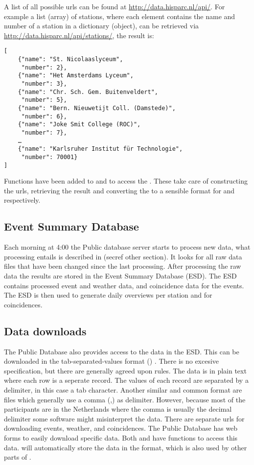 A list of all possible urls can be found at \url{http://data.hisparc.nl/api/}. For example a list (array) of \hisparc stations, where each element contains the name and number of a station in a dictionary (object), can be retrieved via \url{http://data.hisparc.nl/api/stations/}, the result is:

\begin{verbatim}
[
    {"name": "St. Nicolaaslyceum",
     "number": 2},
    {"name": "Het Amsterdams Lyceum",
     "number": 3},
    {"name": "Chr. Sch. Gem. Buitenveldert",
     "number": 5},
    {"name": "Bern. Nieuwetijt Coll. (Damstede)",
     "number": 6},
    {"name": "Joke Smit College (ROC)",
     "number": 7},
    …
    {"name": "Karlsruher Institut für Technologie",
     "number": 70001}
]
\end{verbatim}

Functions have been added to \sapphire and \jsparc to access the \api. These take care of constructing the urls, retrieving the result and converting the \json to a sensible format for \python and \javascript respectively.


\subsection{Event Summary Database}

Each morning at 4:00 \utc the Public database server starts to process new data, what processing entails is described in (secref other section). It looks for all raw data files that have been changed since the last processing. After processing the raw data the results are stored in the Event Summary Database (ESD). The ESD contains processed event and weather data, and coincidence data for the events. The ESD is then used to generate daily overviews per station and for coincidences.


\subsection{Data downloads}

The Public Database also provides access to the data in the ESD. This can be downloaded in the tab-separated-values format (\tsv) \cite{ianatexttsv}. There is no excesive \tsv specification, but there are generally agreed upon rules. The data is in plain text where each row is a seperate record. The values of each record are separated by a delimiter, in this case a tab character. Another similar and common format are \csv files which generally use a comma (,) as delimiter. However, because most of the \hisparc participants are in the Netherlands where the comma is usually the decimal delimiter some software might misinterpret the data. There are separate urls for downloading events, weather, and coincidences. The Public Database has web forms to easily download specific data. Both \sapphire and \jsparc have functions to access this data. \sapphire will automatically store the data in the \hdf format, which is also used by other parts of \sapphire.


